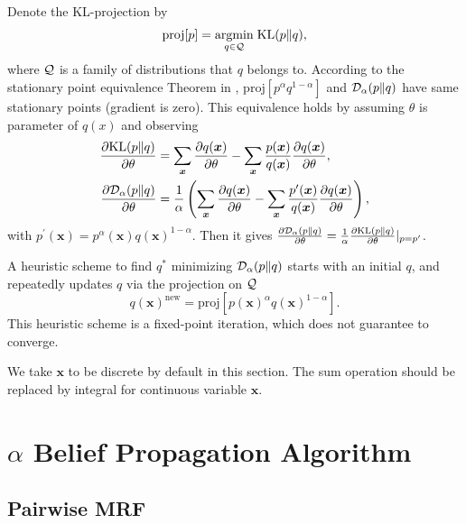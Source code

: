 Denote the KL-projection by
\begin{equation}
  \text{proj}[p] = \underset{q \in \mathcal{Q}}{\operatorname{argmin}}\; \mathrm{KL}(p\|q),
\end{equation}
where $\mathcal{Q}$ is a family of distributions that $q$ belongs to.
According to the stationary point equivalence Theorem in \cite{divergence-measures-and-message-passing}, $\text{proj}[p^{\alpha}q^{1- \alpha}]$ and $\mathcal{D}_{\alpha}(p\|q)$ have same stationary points (gradient is zero). This equivalence holds by assuming $\theta$ is parameter of $q(x)$ and observing
\begin{align}
  \frac{ \partial \mathrm{KL}(p\|q)}{\partial \theta} &= \sum_{\bm{x}} \frac{ \partial q(\bm{x})}{\partial \theta} - \sum_{\bm{x}}\frac{p(\bm{x})}{q(\bm{x})} \frac{ \partial q(\bm{x})}{\partial \theta} , \nonumber \\
  \frac{ \partial \mathrm{\mathcal{D}_{\alpha}}(p\|q)}{\partial \theta} &= \frac{1}{\alpha} \left( \sum_{\bm{x}} \frac{ \partial q(\bm{x})}{\partial \theta} - \sum_{\bm{x}}\frac{p^{\prime}(\bm{x})}{q(\bm{x})} \frac{ \partial q(\bm{x})}{\partial \theta} \right), \nonumber
\end{align}
with $p^{\prime}(\bm{x}) = p^{\alpha}(\bm{x})q(\bm{x})^{1-\alpha}$. Then it gives $\frac{ \partial \mathrm{\mathcal{D}_{\alpha}}(p\|q)}{\partial \theta}  = \frac{1}{\alpha}\frac{ \partial \mathrm{KL}(p\|q)}{\partial \theta}|_{p=p^{\prime}}$.

A heuristic scheme to find $q^{\ast}$ minimizing $\mathcal{D}_{\alpha}(p\|q)$ starts with an initial $q$, and repeatedly updates $q$ via the projection on $\mathcal{Q}$
\begin{equation}\label{eq:fixed-point-iter}
  q(\bm{x})^{\text{new}}  = \text{proj}[p(\bm{x})^{\alpha}q(\bm{x})^{1-\alpha}].
\end{equation}
This heuristic scheme is a fixed-point iteration, which does not guarantee to converge.

\begin{remark}
  We take $\bm{x}$ to be discrete by default in this section. The sum operation should be replaced by integral for continuous variable $\bm{x}$.
\end{remark}

\section{$\alpha$ Belief Propagation Algorithm}\label{sec:alpha-bp-factor-refine}

\subsection{Pairwise MRF}

